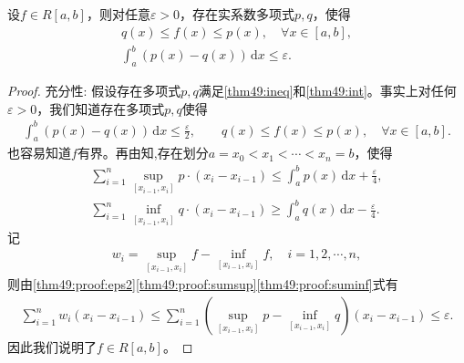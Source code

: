 \documentclass[../../main.tex]{subfiles}%
\begin{document}
\begin{theorem}\label{theorem:上下逼近}
设$f\in R[a,b]$，则对任意$\varepsilon>0$，存在实系数多项式$p,q$，使得
\begin{gather}
q(x)\leqslant f(x)\leqslant p(x),\quad \forall x\in[a,b], \label{thm49:ineq}\\
\int_{a}^{b} (p(x)-q(x))\,\mathrm{d}x \leqslant \varepsilon. \label{thm49:int}
\end{gather}
\end{theorem}
\begin{proof}

{\heiti 充分性:} 假设存在多项式$p,q$满足\eqref{thm49:ineq}和\eqref{thm49:int}。事实上对任何$\varepsilon>0$，我们知道存在多项式$p,q$使得
\begin{gather}
\int_{a}^{b} (p(x)-q(x))\,\mathrm{d}x \leqslant \frac{\varepsilon}{2}, \label{thm49:proof:eps2}\qquad 
q(x)\leqslant f(x)\leqslant p(x),\quad \forall x\in[a,b]. 
\end{gather}
也容易知道$f$有界。再由知,存在划分$a=x_0<x_1<\cdots<x_n=b$，使得
\begin{align}
\sum\limits_{i=1}^{n} \sup_{[x_{i-1},x_i]} p \cdot (x_i-x_{i-1}) \leqslant \int_{a}^{b} p(x)\,\mathrm{d}x + \frac{\varepsilon}{4}, \label{thm49:proof:sumsup}\\
\sum\limits_{i=1}^{n} \inf_{[x_{i-1},x_i]} q \cdot (x_i-x_{i-1}) \geqslant \int_{a}^{b} q(x)\,\mathrm{d}x - \frac{\varepsilon}{4}. \label{thm49:proof:suminf}
\end{align}
记
\begin{align*}
w_i=\sup_{[x_{i-1},x_i]} f - \inf_{[x_{i-1},x_i]} f,\quad i=1,2,\cdots,n,
\end{align*}
则由\eqref{thm49:proof:eps2}\eqref{thm49:proof:sumsup}\eqref{thm49:proof:suminf}式有
\begin{align}
\sum\limits_{i=1}^{n} w_i (x_i-x_{i-1}) \leqslant \sum\limits_{i=1}^{n} \left( \sup_{[x_{i-1},x_i]} p - \inf_{[x_{i-1},x_i]} q \right)(x_i-x_{i-1}) \leqslant \varepsilon. \label{thm49:proof:osc}
\end{align}
因此我们说明了$f\in R[a,b]$。


\end{proof}
\end{document}
